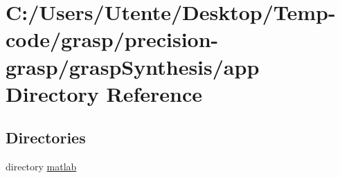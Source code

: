 \section{C\+:/\+Users/\+Utente/\+Desktop/\+Temp-\/code/grasp/precision-\/grasp/grasp\+Synthesis/app Directory Reference}
\label{dir_361d6f54a249a0704f3edbbd851792f7}
\subsection*{Directories}
\begin{DoxyCompactItemize}
\item 
directory \hyperlink{dir_a103fce2cbc1c7bf88f5e82d806ee4ab}{matlab}
\end{DoxyCompactItemize}
